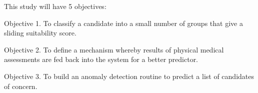 

\noindent
This study will have 5 objectives:

Objective 1. To classify a candidate into a small number of groups that give a sliding suitability score.


Objective 2. To define a mechanism whereby results of physical medical assessments are fed back into the system for a better predictor.


Objective 3. To build an anomaly detection routine to predict a list of candidates of concern.

